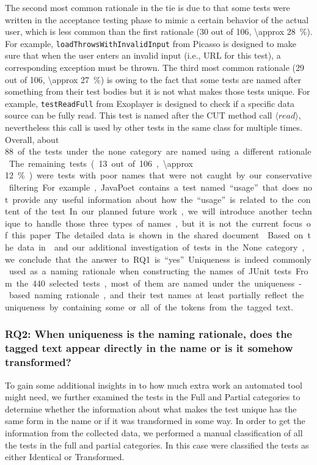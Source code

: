 The second most common rationale in the tie is due to that some tests were written in the acceptance testing phase to mimic a certain behavior of the actual user, which is less common than the first rationale (\num{30} out of \num{106}, \SI{\approx 28}{\percent}).
%
For example, \texttt{load\-Throws\-With\-Invalid\-Input} from Picasso is designed to make sure that when the user enters an invalid input (i.e., URL for this test), a corresponding exception must be thrown.
%
The third most common rationale (\num{29} out of \num{106}, \SI{\approx 27}{\percent}) is owing to the fact that some tests are named after something from their test bodies but it is not what makes those tests unique.
%
For example, \texttt{test\-Read\-Full} from Exoplayer is designed to check if a specific data source can be fully read. This test is named after the CUT method call $\langle read \rangle$, nevertheless this call is used by other tests in the same class for multiple times.
%
Overall, about \SI{88} of the tests under the none category are named using a different rationale. 
%
The remaining tests (\num{13} out of \num{106}, \SI{\approx 12}{\percent}) were tests with poor names that were not caught by our conservative filtering.
%
For example, JavaPoet contains a test named \enquote{usage} that does not provide any useful information about how the \enquote{usage} is related to the content of the test.
%
In our planned future work, we will introduce another technique to handle those three types of names, but it is not the current focus of this paper.
%
The detailed data is shown in the shared document~\cite{emp-data}.


Based on the data in~ and our additional investigation of tests in the None category, we conclude that the answer to RQ1 is \enquote{yes}.
%
Uniqueness is indeed commonly used as a naming rationale when constructing the names of JUnit tests.
%
From the \num{440} selected tests, most of them are named under the uniqueness-based naming rationale, and their test names at least partially reflect the uniqueness by containing some or all of the tokens from the tagged text.


\subsubsection{RQ2: When uniqueness is the naming rationale, does the tagged text appear directly in the name or is it somehow transformed?}

To gain some additional insights in to how much extra work an automated tool might need, we further examined the tests in the Full and Partial categories to determine whether the information about what makes the test unique has the same form in the name or if it was transformed in some way.
%
In order to get the information from the collected data, we performed a manual classification of all the tests in the full and partial categories.
%
In this case were classified the tests as either Identical or Transformed.

